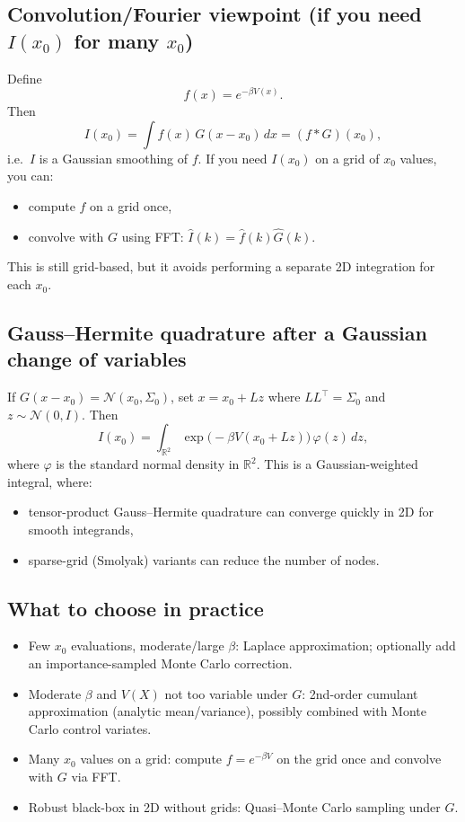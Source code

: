 \documentclass[twocolumn]{notes}
\begin{document}
\subsection{Convolution/Fourier viewpoint (if you need $I(x_0)$ for many $x_0$)}
Define
\[
f(x)=e^{-\beta V(x)}.
\]
Then
\[
I(x_0)=\int f(x)\,G(x-x_0)\,dx = (f*G)(x_0),
\]
i.e.\ $I$ is a Gaussian smoothing of $f$. If you need $I(x_0)$ on a grid of $x_0$ values, you can:
\begin{itemize}
\item compute $f$ on a grid once,
\item convolve with $G$ using FFT: $\widehat{I}(k)=\widehat{f}(k)\widehat{G}(k)$.
\end{itemize}
This is still grid-based, but it avoids performing a separate 2D integration for each $x_0$.

\subsection{Gauss--Hermite quadrature after a Gaussian change of variables}
If $G(x-x_0)=\mathcal N(x_0,\Sigma_0)$, set $x=x_0+Lz$ where $LL^\top=\Sigma_0$ and $z\sim\mathcal N(0,I)$. Then
\[
I(x_0)=\int_{\mathbb R^2} \exp\!\big(-\beta V(x_0+Lz)\big)\,\varphi(z)\,dz,
\]
where $\varphi$ is the standard normal density in $\mathbb R^2$. This is a Gaussian-weighted integral, where:
\begin{itemize}
\item tensor-product Gauss--Hermite quadrature can converge quickly in 2D for smooth integrands,
\item sparse-grid (Smolyak) variants can reduce the number of nodes.
\end{itemize}

\subsection{What to choose in practice}
\begin{itemize}
\item Few $x_0$ evaluations, moderate/large $\beta$: Laplace approximation; optionally add an importance-sampled Monte Carlo correction.
\item Moderate $\beta$ and $V(X)$ not too variable under $G$: 2nd-order cumulant approximation (analytic mean/variance), possibly combined with Monte Carlo control variates.
\item Many $x_0$ values on a grid: compute $f=e^{-\beta V}$ on the grid once and convolve with $G$ via FFT.
\item Robust black-box in 2D without grids: Quasi--Monte Carlo sampling under $G$.
\end{itemize}
\end{document}
